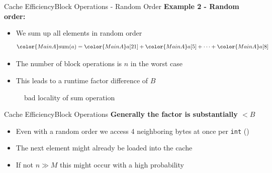 \begin{frame}{Cache Efficiency}{Block Operations - Random Order}
  \textbf{Example 2 - Random order:}
  \begin{itemize}
    \item<2->
      We sum up all elements in {\color{MainA}random order}
      \begin{displaymath}
        {\color{MainA}\mathrm{sum}(a)} =
        {\color{MainA}a[21]} +
        {\color{MainA}a[5]} +
        \dots +
        {\color{MainA}a[8]}
      \end{displaymath}
    \item<3->
      The number of block operations is {\color{MainA}$n$} in the
      {\color{MainA}worst case}
    \item<4->
      This leads to a runtime factor difference of {\color{MainA}$B$}
  \end{itemize}
   \vspace{-1.0em}
  \begin{figure}%
    \begin{adjustbox}{width=\linewidth}%
    \end{adjustbox}%
    \caption{bad locality of sum operation}
    \label{fig:caching:memory_locality_random}
  \end{figure}%
  \vspace{-1.0em}
\end{frame}


\begin{frame}{Cache Efficiency}{Block Operations}
  \textbf{Generally the factor is substantially {\color{MainA}$< B$}}
  \begin{itemize}
    \item<2->
      Even with a {\color{MainA}random order} we access 4
      neighboring bytes at once per \texttt{int} ()
    \item<3->
      The next element might already be loaded into the cache
    \item<4->
      If {\color{MainA}not $n \gg M$} this might occur with a high probability 
  \end{itemize}
\end{frame}


